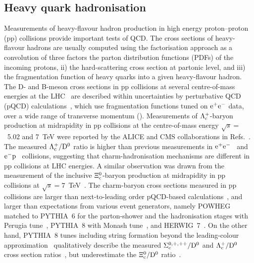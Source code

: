 \subsection{Heavy quark hadronisation}
Measurements of heavy-flavour hadron production in high energy proton--proton (pp) collisions provide important tests of QCD.
The cross sections of heavy-flavour hadrons are usually computed using the factorisation approach as a convolution of three factors \cite{Collins:1985gm} the parton distribution functions (PDFs) of the incoming protons, ii) the hard-scattering cross section at partonic level, and iii) the fragmentation function of heavy quarks into a given heavy-flavour hadron.
The D- and B-meson cross sections in pp collisions at several centre-of-mass energies at the LHC~\cite{Acharya:2019mgn,nonpromptD,Sirunyan:2017xss} are described within uncertainties by perturbative QCD (pQCD) calculations~\cite{Kramer:2017gct,Helenius:2018uul,Cacciari:1998it,Cacciari:2012ny,Kniehl:2020szu}, which use fragmentation functions tuned on $\rm{e^+e^-}$ data, over a wide range of transverse momentum (\pt).
Measurements of $\rm \Lambda^{+}_c$-baryon production at midrapidity in pp collisions at the centre-of-mass energy $\sqrt{s}=$~5.02 and 7~TeV were reported by the ALICE and CMS collaborations in Refs.~\cite{Sirunyan:2019fnc,Acharya:2017kfy,Acharya:2020uqi}. The measured $\rm \Lambda^{+}_c/{\rm D^0}$ ratio is higher than previous measurements in $\rm{e^+e^-}$~\cite{Albrecht:1988an,Avery:1990bc,Gladilin:2014tba} and ${\rm e^-p}$~\cite{Chekanov:2005mm,Abramowicz:2013eja} collisions, suggesting that charm-hadronisation mechanisms are different in pp collisions at LHC energies. 
A similar observation was drawn from the measurement of the inclusive $\Xi^0_{\rm c}$-baryon production at midrapidity in pp collisions at $\sqrt{s} = 7$~TeV~\cite{Acharya:2017lwf}.
The charm-baryon cross sections measured in pp collisions are larger than next-to-leading order pQCD-based calculations~\cite{Kniehl:2020szu}, and larger than expectations from various event generators, namely POWHEG matched to PYTHIA~6 for the parton-shower and the hadronisation stages with Perugia tune~\cite{Frixione:2007nw}, PYTHIA~8 with Monash tune~\cite{Skands:2014pea}, and HERWIG~7~\cite{Bahr:2008pv}.
On the other hand, PYTHIA~8 tunes including string formation beyond the leading-colour approximation~\cite{Christiansen:2015yqa} qualitatively describe the measured $\rm \Sigma^{0,+,++}_c/{\rm D^0}$ and $\rm \Lambda^{+}_c/{\rm D^0}$ cross section ratios~\cite{SigmacLambdac,Acharya:2020uqi}, but underestimate the $\Xi^0_{\rm c}/{\rm D^0}$ ratio~\cite{Acharya:2017lwf}. 
